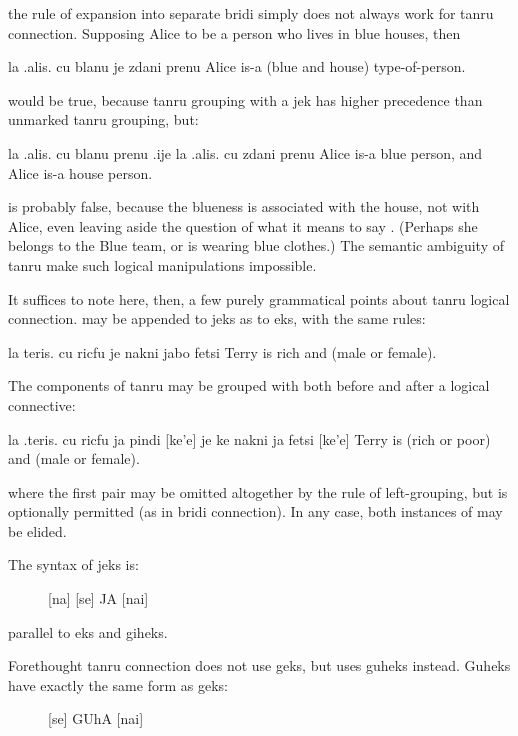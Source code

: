 {\noindent}the rule of expansion into separate bridi simply does not
    always work for tanru connection. Supposing Alice to be a
    person who lives in blue houses, then
\begin{example}
la .alis. cu blanu je zdani prenu\n
Alice is-a (blue and house) type-of-person.
\end{example}

{\noindent}would be true, because tanru grouping with a jek has higher
    precedence than unmarked tanru grouping, but:
\begin{example}
la .alis. cu blanu prenu\n
\T	.ije la .alis. cu zdani prenu\n
Alice is-a blue person,\n
\T	and Alice is-a house person.
\end{example}

{\noindent}is probably false, because the blueness is associated with the
    house, not with Alice, even leaving aside the question of what
    it means to say . (Perhaps she
    belongs to the Blue team, or is wearing blue clothes.) The
    semantic ambiguity of tanru make such logical manipulations
    impossible. 

It suffices to note here, then, a few purely grammatical
    points about tanru logical connection.  may be appended
    to jeks as to eks, with the same rules:
\begin{example}
la teris. cu ricfu je nakni jabo fetsi\n
Terry is rich and (male or female).
\end{example}

The components of tanru may be grouped with  both before
    and after a logical connective:
\begin{example}
la .teris. cu  ricfu ja pindi [ke'e]\n
\T	je ke nakni ja fetsi [ke'e]\n
Terry is (rich or poor)\n
\T	and (male or female).
\end{example}

{\noindent}where the first  pair may be omitted altogether
    by the rule of left-grouping, but is optionally permitted (as
    in bridi connection). In any case, both instances of 
    may be elided. 

The syntax of jeks is:
\begin{description}
\item[] [na] [se] JA [nai]
\end{description}

parallel to eks and giheks. 

Forethought tanru connection does not use geks, but uses
    guheks instead. Guheks have exactly the same form as geks:
\begin{description}
\item[] [se] GUhA [nai]
\end{description}

